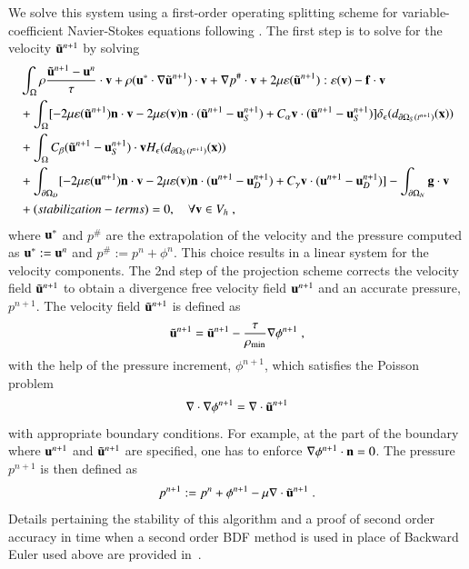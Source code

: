 \documentclass[final,3p,times]{elsarticle}
\newcommand{\bg}{\mathbf{g}}
\begin{document}
We solve this system using a first-order operating splitting scheme for variable-coefficient Navier-Stokes equations following \cite{GS09}. The first step is to solve for the velocity $\tilde{\mathbf{u}}^{n+1}$ by solving
\begin{align}
   &\int_\Omega\rho\frac{\tilde{\bu}^{n+1}-\bu^n}{\tau}\cdot\bv + \rho(\bu^*\cdot\nabla\tilde{\bu}^{n+1}) \cdot \bv 
   +\nabla p^{\#}\cdot\bv +2\mu \varepsilon(\tilde{\bu}^{n+1}):\varepsilon(\bv)
   -\bef\cdot\bv\nonumber\\
   &+\int_\Omega [-2\mu \varepsilon(\tilde{\bu}^{n+1})\bn\cdot\bv
   -2\mu\varepsilon(\bv)\bn\cdot(\tilde{\bu}^{n+1}-\bu_S^{n+1})
   +C_\alpha\bv\cdot(\tilde{\bu}^{n+1}-\bu_S^{n+1})]\delta_\epsilon(d_{\partial\Omega_S(t^{n+1})}(\bx))\nonumber\\
   &+\int_\Omega C_\beta (\tilde{\bu}^{n+1}-\bu_S^{n+1})\cdot\bv H_\epsilon(d_{\partial\Omega_S(t^{n+1})}(\bx))\nonumber\\
   &+\int_{\partial\Omega_D} [-2\mu\varepsilon(\bu^{n+1})\bn\cdot\bv
   -2\mu\varepsilon(\bv)\bn\cdot(\bu^{n+1}-\bu_D^{n+1})
   +C_\gamma\bv\cdot(\bu^{n+1}-\bu_D^{n+1})]-\int_{\partial\Omega_N}\bg\cdot\bv\nonumber\\
   &+(stabilization-terms)=0,\quad\forall \bv\in V_h \; ,
\end{align}
where $\mathbf{u}^*$ and $p^\#$ are the extrapolation of the velocity and the pressure computed as $\mathbf{u}^*:=\mathbf{u}^n$ and $p^\#:=p^n+\phi^{n}$. This choice results in a linear system for the velocity components.
The 2nd step of the projection scheme corrects the velocity field $\tilde{\mathbf{u}}^{n+1}$ to obtain 
a divergence free velocity field ${\mathbf{u}}^{n+1}$ and an accurate pressure, $p^{n+1}$. The velocity field $\tilde{\mathbf{u}}^{n+1}$ is defined as 
\begin{align*}
   \tilde{\mathbf{u}}^{n+1} = \tilde{\mathbf{u}}^{n+1} - \frac{\tau}{\rho_{\min}}\nabla\phi^{n+1} \; ,
\end{align*}
with the help of the pressure increment, $\phi^{n+1}$, which satisfies the Poisson problem 
\begin{align*}
   \nabla\cdot\nabla\phi^{n+1} = \nabla\cdot\tilde{\mathbf{u}}^{n+1} 
\end{align*}
with appropriate boundary conditions. For example, at the part of the boundary where $\mathbf{u}^{n+1}$ and 
$\tilde{\mathbf{u}}^{n+1}$ are specified, one has to enforce $\nabla\phi^{n+1}\cdot\mathbf{n}=0$.
The pressure $p^{n+1}$ is then defined as 
\begin{align*}
   p^{n+1} := p^n + \phi^{n+1} - \mu \nabla\cdot\tilde{\mathbf{u}}^{n+1} \; .
\end{align*}
Details pertaining the stability of this algorithm and a proof of second order accuracy in time when a second order BDF method is used in place of Backward
Euler used above are provided in~\cite{GS09}.
\end{document}
